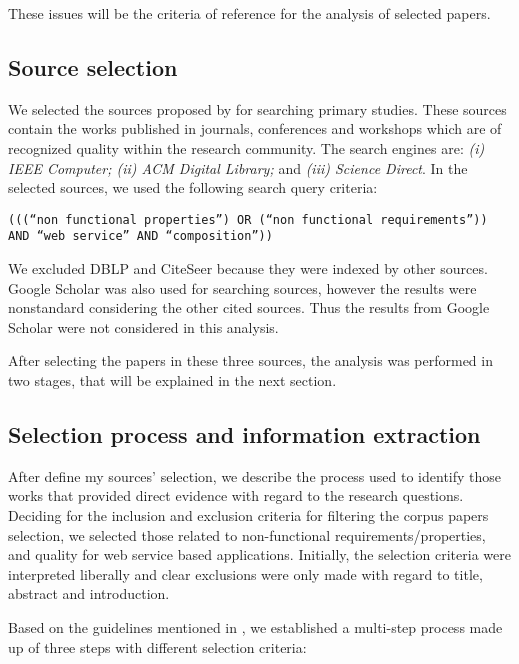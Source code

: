These issues will be the criteria of reference for the analysis of selected
papers.
  
\subsection{Source selection}
\label{subsec:souce_selection}

We selected the sources proposed by \cite{Kitchenham08} for searching primary
studies. These sources contain the works published in journals, conferences and
workshops which are of recognized quality within the research community. The
search engines are: \textit{(i) IEEE Computer; (ii) ACM Digital Library;} and
\textit{(iii) Science Direct}. In the selected sources, we used the following search
query criteria:

\begin{center}
\texttt{(((``non functional properties'') OR (``non functional requirements''))
AND ``web service'' AND ``composition''))}
\end{center}

We excluded DBLP and CiteSeer because they were indexed by other sources. Google
Scholar was also used for searching sources, however the results were
nonstandard considering the other cited sources. Thus the results from Google
Scholar were not considered in this analysis. 

After selecting the papers in these three sources, the analysis was performed in
two stages, that will be explained in the next section.
 
\subsection{Selection process and information extraction}
\label{subsec:selection_process}
  
After define my sources' selection, we describe the
process used to identify those works that provided direct evidence
with regard to the research questions. Deciding for the inclusion and exclusion
criteria for filtering the corpus papers selection, we selected those related to
non-functional requirements/properties, and quality for web service based applications.
Initially, the selection criteria were interpreted liberally and clear
exclusions were only made with regard to title, abstract and introduction.

Based on the guidelines mentioned in \cite{Kitchenham08}, we established a
multi-step process made up of three steps with different selection
criteria:
   
